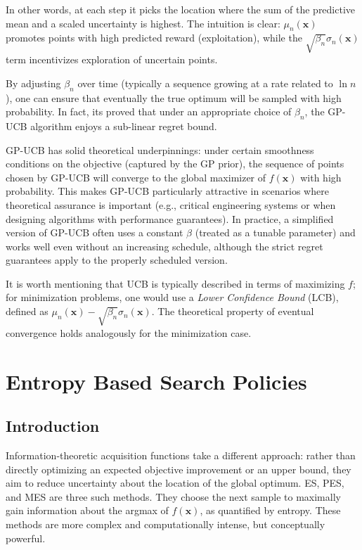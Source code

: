 \documentclass{ut-thesis}
\begin{document}
In other words, at each step it picks the location where the sum of the predictive mean and a scaled uncertainty is highest. The intuition is clear: $\mu_n(\mathbf{x})$ promotes points with high predicted reward (exploitation), while the $\sqrt{\beta_n}\sigma_n(\mathbf{x})$ term incentivizes exploration of uncertain points. 

By adjusting $\beta_n$ over time (typically a sequence growing at a rate related to $\ln n$), one can ensure that eventually the true optimum will be sampled with high probability. In fact, its proved that under an appropriate choice of $\beta_n$, the GP-UCB algorithm enjoys a sub-linear regret bound\cite{10.5555/3104322.3104451}.

GP-UCB has solid theoretical underpinnings: under certain smoothness conditions on the objective (captured by the GP prior), the sequence of points chosen by GP-UCB will converge to the global maximizer of $f(\mathbf{x})$ with high probability. This makes GP-UCB particularly attractive in scenarios where theoretical assurance is important (e.g., critical engineering systems or when designing algorithms with performance guarantees). In practice, a simplified version of GP-UCB often uses a constant $\beta$ (treated as a tunable parameter) and works well even without an increasing schedule, although the strict regret guarantees apply to the properly scheduled version. 

It is worth mentioning that UCB is typically described in terms of maximizing $f$; for minimization problems, one would use a \emph{Lower Confidence Bound} (LCB), defined as $\mu_n(\mathbf{x}) - \sqrt{\beta_n}\sigma_n(\mathbf{x})$. The theoretical property of eventual convergence holds analogously for the minimization case.



\chapter{Entropy Based Search Policies}

\section{Introduction}

Information-theoretic acquisition functions take a different approach: rather than directly optimizing an expected objective improvement or an upper bound, they aim to reduce uncertainty about the location of the global optimum. ES, PES, and MES are three such methods. They choose the next sample to maximally gain information about the argmax of $f(\mathbf{x})$, as quantified by entropy. These methods are more complex and computationally intense, but conceptually powerful.
\end{document}
